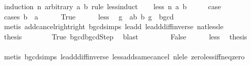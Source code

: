 \begin{isabellebody}
\ {\isacharparenleft}{\kern0pt}induction\ n\ arbitrary{\isacharcolon}{\kern0pt}\ a\ b\ rule{\isacharcolon}{\kern0pt}\ less{\isacharunderscore}{\kern0pt}induct{\isacharparenright}{\kern0pt}\isanewline
\ \ \isamarkupfalse%
\ {\isacharparenleft}{\kern0pt}less\ n\ a\ b{\isacharparenright}{\kern0pt}\isanewline
\ \ \isamarkupfalse%
\ \isamarkupfalse%
\ {\isacharquery}{\kern0pt}case\isanewline
\ \ \isamarkupfalse%
\ {\isacharparenleft}{\kern0pt}cases\ {\isachardoublequoteopen}b\ {\isasymle}\ a{\isachardoublequoteclose}{\isacharparenright}{\kern0pt}\isanewline
\ \ \ \ \isamarkupfalse%
\ True\isanewline
\ \ \ \ \isamarkupfalse%
\ less\ \isamarkupfalse%
\ g\ \ {\isachardoublequoteopen}{\isacharparenleft}{\kern0pt}a{\isacharminus}{\kern0pt}b{\isacharcomma}{\kern0pt}\ b{\isacharcomma}{\kern0pt}\ g{\isacharparenright}{\kern0pt}\ {\isasymin}\ bgcd{\isachardoublequoteclose}\isanewline
\ \ \ \ \ \ \isamarkupfalse%
\ {\isacharparenleft}{\kern0pt}metis\ add{\isacharunderscore}{\kern0pt}cancel{\isacharunderscore}{\kern0pt}right{\isacharunderscore}{\kern0pt}right\ bgcd{\isachardot}{\kern0pt}simps\ le{\isacharunderscore}{\kern0pt}add{}\ le{\isacharunderscore}{\kern0pt}add{\isacharunderscore}{\kern0pt}diff{\isacharunderscore}{\kern0pt}inverse\ nat{\isacharunderscore}{\kern0pt}less{\isacharunderscore}{\kern0pt}le{\isacharparenright}{\kern0pt}\isanewline
\ \ \ \ \isamarkupfalse%
\ {\isacharquery}{\kern0pt}thesis\isanewline
\ \ \ \ \ \ \isamarkupfalse%
\ True\ bgcd{\isachardot}{\kern0pt}bgcdStep\ \isamarkupfalse%
\ blast\isanewline
\ \ \isamarkupfalse%
\isanewline
\ \ \ \ \isamarkupfalse%
\ False\isanewline
\ \ \ \ \isamarkupfalse%
\ less\ \isamarkupfalse%
\ {\isacharquery}{\kern0pt}thesis\isanewline
\ \ \ \ \ \ \isamarkupfalse%
\ {\isacharparenleft}{\kern0pt}metis\ bgcd{\isachardot}{\kern0pt}simps\ le{\isacharunderscore}{\kern0pt}add{\isacharunderscore}{\kern0pt}diff{\isacharunderscore}{\kern0pt}inverse\ less{\isacharunderscore}{\kern0pt}add{\isacharunderscore}{\kern0pt}same{\isacharunderscore}{\kern0pt}cancel{}\ nle{\isacharunderscore}{\kern0pt}le\ zero{\isacharunderscore}{\kern0pt}less{\isacharunderscore}{\kern0pt}iff{\isacharunderscore}{\kern0pt}neq{\isacharunderscore}{\kern0pt}zero{\isacharparenright}{\kern0pt}\isanewline
\ \ \isamarkupfalse%
\isanewline
{}\isamarkupfalse%
%
\endisatagproof
{\isafoldproof}%
%
\isadelimproof
\isanewline
%
\endisadelimproof
%
\isadelimtheory
\isanewline
%
\endisadelimtheory
%
\isatagtheory
{}\isamarkupfalse%
%
\endisatagtheory
{\isafoldtheory}%
%
\isadelimtheory
%
\endisadelimtheory
%
\end{isabellebody}%
